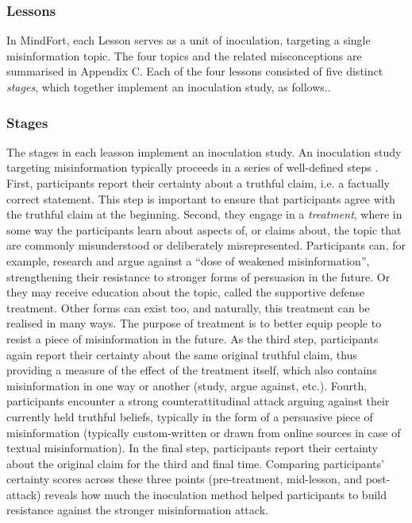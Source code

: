 \documentclass[sigconf]{acmart}
\begin{document}
\subsubsection{Lessons}

In MindFort, each Lesson serves as a unit of inoculation, targeting a single misinformation topic.
The four topics and the related misconceptions are summarised in Appendix C.
Each of the four lessons consisted of five distinct \textit{stages}, which together implement an inoculation study, as follows..

\subsubsection{Stages}
\label{sec:implementation_stages}

The stages in each leasson implement an inoculation study.
An inoculation study targeting misinformation typically proceeds in a series of well-defined steps \cite{McGuire_1964, Fransen_Mollen_Rains_Das_Vermeulen_2024, godbold2000}.
First, participants report their certainty about a truthful claim, i.e. a factually correct statement. 
This step is important to ensure that participants agree with the truthful claim at the beginning. 
Second, they engage in a \textit{treatment}, where in some way the participants learn about aspects of, or claims about, the topic that are commonly misunderstood or deliberately misrepresented. 
Participants can, for example, research and argue against a ``dose of weakened misinformation'', strengthening their resistance to stronger forms of persuasion in the future. 
Or they may receive education about the topic, called the supportive defense treatment.
Other forms can exist too, and naturally, this treatment can be realised in many ways.
The purpose of treatment is to better equip people to resist a piece of misinformation in the future.
As the third step, participants again report their certainty about the same original truthful claim, thus providing a measure of the effect of the treatment itself, which also contains misinformation in one way or another (study, argue against, etc.).
Fourth, participants encounter a strong counterattitudinal attack arguing against their currently held truthful beliefs, typically in the form of a persuasive piece of misinformation (typically custom-written or drawn from online sources in case of textual misinformation).
In the final step, participants report their certainty about the original claim for the third and final time. 
Comparing participants' certainty scores across these three points (pre-treatment, mid-lesson, and post-attack) reveals how much the inoculation method helped participants to build resistance against the stronger misinformation attack.
\end{document}
